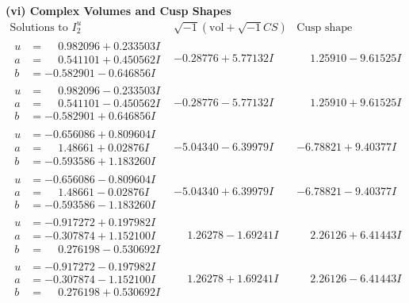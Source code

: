 \documentclass[1p]{elsarticle_modified}
\theoremstyle{definition}
\newcommand{\I}{\sqrt{-1}}
\begin{document}
\newpage\flushleft \textbf{(vi) Complex Volumes and Cusp Shapes}
$$\begin{array}{c|c|c}  
\text{Solutions to }I^u_{2}& \I (\text{vol} + \sqrt{-1}CS) & \text{Cusp shape}\\
 \hline 
\begin{aligned}
u &= \phantom{-}0.982096 + 0.233503 I \\
a &= \phantom{-}0.541101 + 0.450562 I \\
b &= -0.582901 - 0.646856 I\end{aligned}
 & -0.28776 + 5.77132 I & \phantom{-}1.25910 - 9.61525 I \\ \hline\begin{aligned}
u &= \phantom{-}0.982096 - 0.233503 I \\
a &= \phantom{-}0.541101 - 0.450562 I \\
b &= -0.582901 + 0.646856 I\end{aligned}
 & -0.28776 - 5.77132 I & \phantom{-}1.25910 + 9.61525 I \\ \hline\begin{aligned}
u &= -0.656086 + 0.809604 I \\
a &= \phantom{-}1.48661 + 0.02876 I \\
b &= -0.593586 + 1.183260 I\end{aligned}
 & -5.04340 - 6.39979 I & -6.78821 + 9.40377 I \\ \hline\begin{aligned}
u &= -0.656086 - 0.809604 I \\
a &= \phantom{-}1.48661 - 0.02876 I \\
b &= -0.593586 - 1.183260 I\end{aligned}
 & -5.04340 + 6.39979 I & -6.78821 - 9.40377 I \\ \hline\begin{aligned}
u &= -0.917272 + 0.197982 I \\
a &= -0.307874 + 1.152100 I \\
b &= \phantom{-}0.276198 - 0.530692 I\end{aligned}
 & \phantom{-}1.26278 - 1.69241 I & \phantom{-}2.26126 + 6.41443 I \\ \hline\begin{aligned}
u &= -0.917272 - 0.197982 I \\
a &= -0.307874 - 1.152100 I \\
b &= \phantom{-}0.276198 + 0.530692 I\end{aligned}
 & \phantom{-}1.26278 + 1.69241 I & \phantom{-}2.26126 - 6.41443 I \\ \hline\begin{aligned}

\end{aligned}
\end{array}$$
\end{document}
